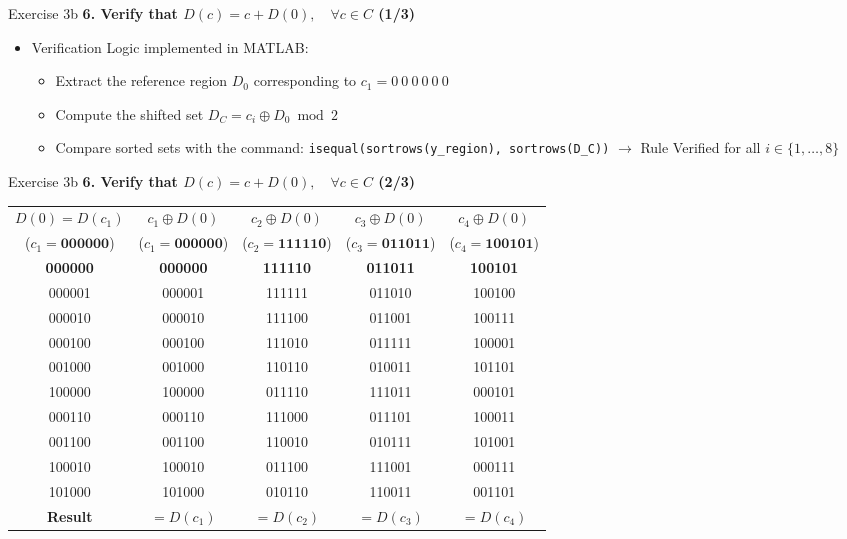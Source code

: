 \documentclass[10pt, aspectratio=169]{beamer}
\newcommand{\question}[1]{{\color{QuestionRed}\textbf{#1}}}
\begin{document}
\begin{frame}{Exercise 3b}
	\question{6. Verify that $D(c) = c + D(0), \quad \forall c \in C$ (1/3)}
	
	\vspace{0.25cm}
	\begin{itemize}
		\item Verification Logic implemented in MATLAB:
		\begin{itemize}
			\item Extract the reference region $D_0$ corresponding to $c_1 = 0\ 0\ 0\ 0\ 0\ 0$
			\item Compute the shifted set $D_C = c_i \oplus D_0 \bmod 2$
			\item Compare sorted sets with the command: \texttt{isequal(sortrows(y\_region), sortrows(D\_C))} $\rightarrow$ Rule Verified for all $i \in \{1, \dots, 8\}$
		\end{itemize}
	\end{itemize}
\end{frame}

\begin{frame}{Exercise 3b}
	\question{6. Verify that $D(c) = c + D(0), \quad \forall c \in C$ (2/3)}
	
	\vspace{0.15cm}
	\begin{table}
		\centering
		\scriptsize
		\renewcommand{\arraystretch}{1.15}
		\begin{tabular}{c | c c c c}
			\toprule
			\textbf{$D(0) = D(c_1)$} & \textbf{$c_1 \oplus D(0)$} & \textbf{$c_2 \oplus D(0)$} & \textbf{$c_3 \oplus D(0)$} & \textbf{$c_4 \oplus D(0)$} \\
			($c_1 = \mathbf{000000}$) & ($c_1 = \mathbf{000000}$) & ($c_2 = \mathbf{111110}$) & ($c_3 = \mathbf{011011}$) & ($c_4 = \mathbf{100101}$) \\
			\midrule
			\textbf{000000} & \textbf{000000} & \textbf{111110} & \textbf{011011} & \textbf{100101} \\
			000001 & 000001 & 111111 & 011010 & 100100 \\
			000010 & 000010 & 111100 & 011001 & 100111 \\
			000100 & 000100 & 111010 & 011111 & 100001 \\
			001000 & 001000 & 110110 & 010011 & 101101 \\
			100000 & 100000 & 011110 & 111011 & 000101 \\
			000110 & 000110 & 111000 & 011101 & 100011 \\
			001100 & 001100 & 110010 & 010111 & 101001 \\
			100010 & 100010 & 011100 & 111001 & 000111 \\
			101000 & 101000 & 010110 & 110011 & 001101 \\
			\midrule
			\textbf{Result} & $= D(c_1)$ \checkmark & $= D(c_2)$ \checkmark & $= D(c_3)$ \checkmark & $= D(c_4)$ \checkmark \\
			\bottomrule
		\end{tabular}
	\end{table}
\end{frame}
\end{document}
